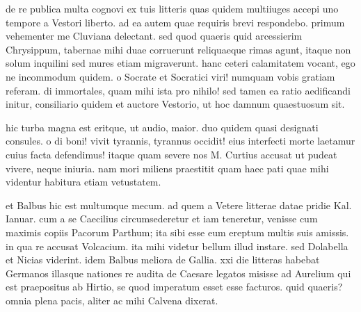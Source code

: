 


 de re publica multa cognovi ex tuis litteris quas quidem multiiuges accepi uno tempore a Vestori liberto. ad ea autem quae requiris brevi respondebo. primum vehementer me Cluviana delectant. sed quod quaeris quid arcessierim Chrysippum, tabernae mihi duae corruerunt reliquaeque rimas agunt, itaque non solum inquilini sed mures etiam migraverunt. hanc ceteri calamitatem vocant, ego ne incommodum quidem. o Socrate et Socratici viri! numquam vobis gratiam referam. di immortales, quam mihi ista pro nihilo! sed tamen ea ratio aedificandi initur, consiliario quidem et auctore Vestorio, ut hoc damnum quaestuosum sit.

 hic turba magna est eritque, ut audio, maior. duo quidem quasi designati consules. o di boni! vivit tyrannis, tyrannus occidit! eius interfecti morte laetamur cuius facta defendimus! itaque quam severe nos M. Curtius accusat ut pudeat vivere, neque iniuria. nam mori miliens praestitit quam haec pati quae mihi videntur habitura etiam vetustatem.

 et Balbus hic est multumque mecum. ad quem a Vetere litterae datae pridie Kal. Ianuar. cum a se Caecilius circumsederetur et iam teneretur, venisse cum maximis copiis Pacorum Parthum; ita sibi esse eum ereptum multis suis amissis. in qua re accusat Volcacium. ita mihi videtur bellum illud instare. sed Dolabella et Nicias viderint. idem Balbus meliora de Gallia. xxi die litteras habebat Germanos illasque nationes re audita de Caesare legatos misisse ad Aurelium qui est praepositus ab Hirtio, se quod imperatum esset esse facturos. quid quaeris? omnia plena pacis, aliter ac mihi Calvena dixerat.
